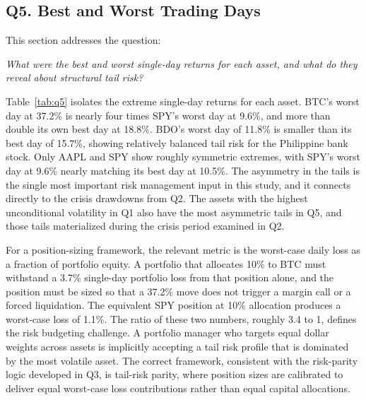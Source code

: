 \subsection{Q5. Best and Worst Trading Days}

This section addresses the question:

\noindent\textit{What were the best and worst single-day returns for each asset, and what do they reveal about structural tail risk?}



Table~\ref{tab:q5} isolates the extreme single-day returns for each asset. BTC's worst day at 37.2\% is nearly four times SPY's worst day at 9.6\%, and more than double its own best day at 18.8\%. BDO's worst day of 11.8\% is smaller than its best day of 15.7\%, showing relatively balanced tail risk for the Philippine bank stock. Only AAPL and SPY show roughly symmetric extremes, with SPY's worst day at 9.6\% nearly matching its best day at 10.5\%. The asymmetry in the tails is the single most important risk management input in this study, and it connects directly to the crisis drawdowns from Q2. The assets with the highest unconditional volatility in Q1 also have the most asymmetric tails in Q5, and those tails materialized during the crisis period examined in Q2.

For a position-sizing framework, the relevant metric is the worst-case daily loss as a fraction of portfolio equity. A portfolio that allocates 10\% to BTC must withstand a 3.7\% single-day portfolio loss from that position alone, and the position must be sized so that a 37.2\% move does not trigger a margin call or a forced liquidation. The equivalent SPY position at 10\% allocation produces a worst-case loss of 1.1\%. The ratio of these two numbers, roughly 3.4 to 1, defines the risk budgeting challenge. A portfolio manager who targets equal dollar weights across assets is implicitly accepting a tail risk profile that is dominated by the most volatile asset. The correct framework, consistent with the risk-parity logic developed in Q3, is tail-risk parity, where position sizes are calibrated to deliver equal worst-case loss contributions rather than equal capital allocations.

